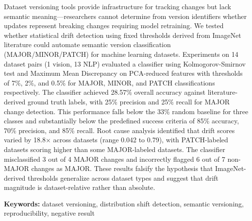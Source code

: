 
Dataset versioning tools provide infrastructure for tracking changes but lack semantic meaning—researchers cannot determine from version identifiers whether updates represent breaking changes requiring model retraining. We tested whether statistical drift detection using fixed thresholds derived from ImageNet literature could automate semantic version classification (MAJOR/MINOR/PATCH) for machine learning datasets. Experiments on 14 dataset pairs (1 vision, 13 NLP) evaluated a classifier using Kolmogorov-Smirnov test and Maximum Mean Discrepancy on PCA-reduced features with thresholds of 7\%, 2\%, and 0.5\% for MAJOR, MINOR, and PATCH classifications respectively. The classifier achieved 28.57\% overall accuracy against literature-derived ground truth labels, with 25\% precision and 25\% recall for MAJOR change detection. This performance falls below the 33\% random baseline for three classes and substantially below the predefined success criteria of 85\% accuracy, 70\% precision, and 85\% recall. Root cause analysis identified that drift scores varied by 18.8× across datasets (range 0.042 to 0.79), with PATCH-labeled datasets scoring higher than some MAJOR-labeled datasets. The classifier misclassified 3 out of 4 MAJOR changes and incorrectly flagged 6 out of 7 non-MAJOR changes as MAJOR. These results falsify the hypothesis that ImageNet-derived thresholds generalize across dataset types and suggest that drift magnitude is dataset-relative rather than absolute.

\textbf{Keywords:} dataset versioning, distribution shift detection, semantic versioning, reproducibility, negative result
